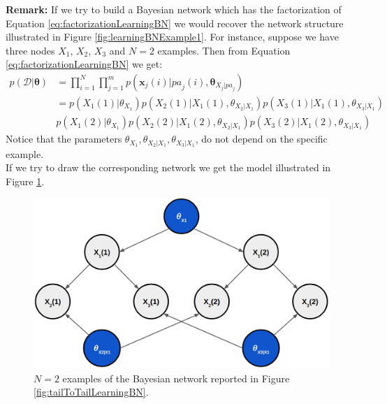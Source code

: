 \textbf{Remark:} If we try to build a Bayesian network which has the factorization of Equation \ref{eq:factorizationLearningBN} we would recover the network structure illustrated in Figure \ref{fig:learningBNExample1}. For instance, suppose we have three nodes $X_1$, $X_2$, $X_3$ and $N=2$ examples. Then from Equation \ref{eq:factorizationLearningBN} we get:
\begin{align*}
    p(\mathcal{D}|\pmb{\theta}) &= \prod_{i=1}^N \prod_{j=1}^m p(\pmb{x}_j(i) | \mathit{pa}_j(i), \pmb{\theta}_{X_j | \mathit{pa}_j}) \\
    &= p(X_1(1) | \theta_{X_1}) p(X_2(1)|X_1(1), \theta_{X_2|X_1}) p(X_3(1) | X_1(1), \theta_{X_3|X_1})\\
    & p(X_1(2) | \theta_{X_1}) p(X_2(2)|X_1(2), \theta_{X_2|X_1}) p(X_3(2) | X_1(2), \theta_{X_3|X_1})
\end{align*}
Notice that the parameters $\theta_{X_1}, \theta_{X_2|X_1}, \theta_{X_3|X_1}$, do not depend on the specific example.\\
If we try to draw the corresponding network we get the model illustrated in Figure \ref{fig:learningBNSmallExample}.

\begin{figure}
    \centering
    \includegraphics[width=\textwidth]{images/learningBNSmallExample.png}
    \caption{$N=2$ examples of the Bayesian network reported in Figure \ref{fig:tailToTailLearningBN}.}
    \label{fig:learningBNSmallExample}
\end{figure}

